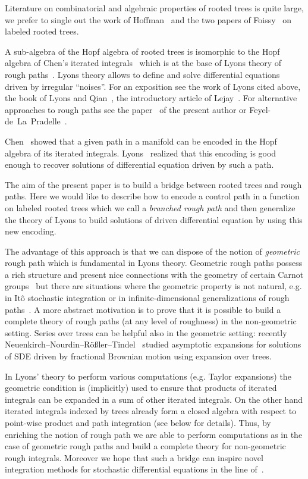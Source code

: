 \documentclass[a4paper,11pt,reqno]{article}
\newcommand{\1}{{\bf 1}}
\begin{document}
Literature on combinatorial and algebraic properties of rooted trees is quite large, we prefer to single out the
work of  Hoffman~\cite{MR1990174} and the two papers of
Foissy~\cite{MR1909461,MR1905177} on labeled rooted trees.

A sub-algebra of the  Hopf algebra of rooted trees is isomorphic to the Hopf algebra of
Chen's iterated integrals~\cite{MR0454968,MR1847673} which is at the
base of Lyons theory of rough paths~\cite{MR1654527}. Lyons
theory allows to define and solve differential
equations driven by irregular ``noises''. For an 
exposition see the work of Lyons cited above, the book of Lyons and Qian~\cite{MR2036784}, the introductory article of Lejay~\cite{MR2053040}. For alternative approaches to rough paths see the paper~\cite{MR2091358} of the present author or Feyel-de~La~Pradelle~\cite{feyel}. 

 Chen~\cite{MR0454968}  showed that a given path in a
manifold can be encoded  in the Hopf algebra of its
iterated integrals. Lyons~\cite{MR1654527} realized that this encoding is good enough
to recover solutions of differential equation driven by such a path.

The aim of the present paper is to build a bridge between rooted trees
and rough paths. Here we would like to describe how to encode a
control path in a function on labeled rooted trees which we call a
\emph{branched rough path} and then generalize the theory of Lyons
to build solutions of driven differential equation by using this
new encoding. 


The advantage of this approach is that we can dispose of
the notion of \emph{geometric} rough path which is fundamental in Lyons
theory. Geometric rough paths possess a rich structure and present
nice connections with the geometry of certain Carnot
groups~\cite{MR2144230} but there are situations where the geometric
property is not natural, e.g. in It\^o stochastic integration or in
infinite-dimensional generalizations of rough
paths~\cite{kdv,TindelGubinelli}. A more abstract motivation is to
prove that it is possible to build a complete theory of rough paths
(at any level of roughness) in the non-geometric setting. 
Series over trees can be helpful also in the geometric setting:
recently Neuenkirch--Nourdin--R\"o{\ss}ler--Tindel~\cite{tindelnourdin} studied asymptotic expansions for solutions of SDE driven by fractional Brownian motion using expansion over trees.

In Lyons' theory  to perform various
computations (e.g. Taylor expansions) the geometric
condition is (implicitly) used to  ensure that products of iterated integrals can be
expanded in a sum of other iterated integrals. On the other hand
iterated integrals indexed by trees already form a closed algebra with
respect to point-wise product and path integration (see below for
details). Thus, by enriching the notion of rough path we are  able to perform
computations as in the case of geometric rough paths and build a
complete theory for non-geometric rough integrals. 
Moreover we hope that such a bridge can inspire novel integration
methods for stochastic differential equations in the line of~\cite{MR2198539}.
\end{document}
